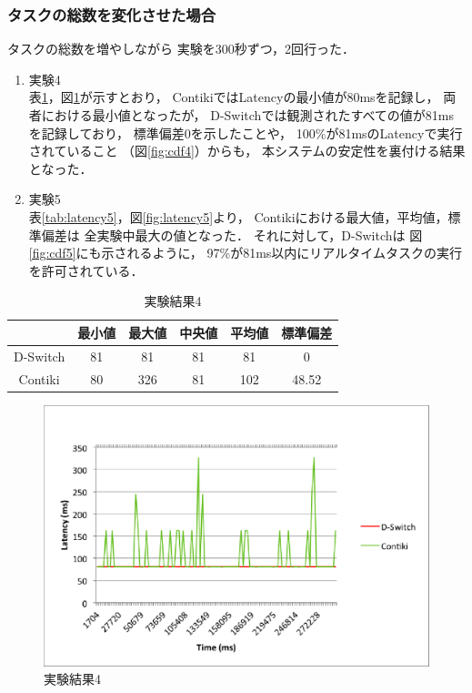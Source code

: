 \subsubsection{タスクの総数を変化させた場合}

\vspace{0.5em}タスクの総数を増やしながら
実験を300秒ずつ，2回行った．

\begin{enumerate}
\item{実験4}\\
表\ref{tab:latency4}，図\ref{fig:latency4}が示すとおり，
ContikiではLatencyの最小値が80msを記録し，
両者における最小値となったが，
D-Switchでは観測されたすべての値が81msを記録しており，
標準偏差0を示したことや，
100\%が81msのLatencyで実行されていること
（図\ref{fig:cdf4}）からも，
本システムの安定性を裏付ける結果となった．
\newline
\item{実験5}\\
表\ref{tab:latency5}，図\ref{fig:latency5}より，
Contikiにおける最大値，平均値，標準偏差は
全実験中最大の値となった．
それに対して，D-Switchは
図\ref{fig:cdf5}にも示されるように，
97\%が81ms以内にリアルタイムタスクの実行を許可されている．
\end{enumerate}



\begin{table}[htbp]
  \centering
  \caption{実験結果4}
  \begin{tabular}{|c||c|c|c|c|c|} \hline
    \backslashbox{}{} & 最小値 & 最大値 & 中央値 & 平均値 & 標準偏差 \\ \hline \hline
    D-Switch & 81 & 81 & 81 & 81 & 0 \\ \hline
    Contiki & 80 & 326 & 81 & 102 & 48.52 \\ \hline
  \end{tabular}
  \label{tab:latency4}
\end{table}

\begin{figure}[htbp]
 \begin{center}
  \includegraphics[width=120mm]{./images/latency4.eps}
 \end{center}
 \caption{実験結果4}
 \label{fig:latency4}
\end{figure}

